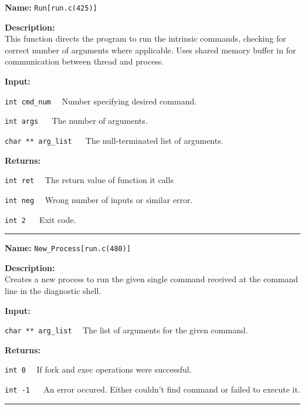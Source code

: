 \documentclass[11pt,a4paper]{article}
\begin{document}
\begin{description}
\item \textbf{Name:} 
\verb|Run[run.c(425)]|

\item \textbf{Description:}\\
 This function directs the program to run the intrinsic commands, checking for correct number of arguments where applicable. Uses shared memory buffer in for communication between thread and process.

\item \textbf{Input:}
\begin{description}
\item \verb|int cmd_num|~~ Number specifying desired command.
\item \verb|int args| ~~ The number of arguments.
\item \verb|char ** arg_list| ~~ The null-terminated list of arguments.
\end{description}

\item \textbf{Returns:}
\begin{description}
\item \verb|int ret|~~ The return value of function it calls
\item \verb|int neg|~~ Wrong number of inputs or similar error.
\item \verb|int 2| ~~ Exit code.
\end{description}
\end{description}\hrule

\begin{description}
\item \textbf{Name:} 
\verb|New_Process[run.c(480)]|

\item \textbf{Description:}\\
Creates a new process to run the given single command received at the command line in the diagnostic shell.

\item \textbf{Input:}
\begin{description}
\item \verb|char ** arg_list|~~ The list of arguments for the given command.
\end{description}

\item \textbf{Returns:}
\begin{description}
\item \verb|int 0|~~ If fork and exec operations were successful.
\item \verb|int -1| ~~ An error occured. Either couldn't find command or failed to execute it.
\end{description}
\end{description}\hrule
\end{document}
